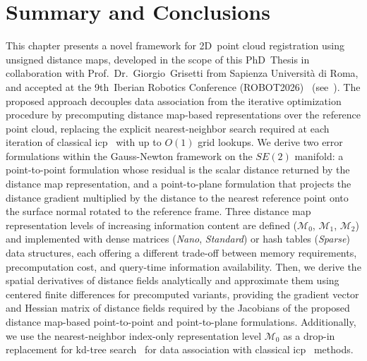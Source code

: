 \section{Summary and Conclusions}\label{sec:distance-maps:conclusions}

This chapter presents a novel framework for 2D~point cloud registration using
unsigned distance maps, developed in the scope of this PhD~Thesis in
collaboration with Prof.~Dr.~Giorgio~Grisetti from Sapienza Università di Roma,
and accepted at the 9th~Iberian Robotics Conference
(ROBOT2026)~\cite{sousa:robot:2026} (see~).
The proposed approach decouples data association from the iterative optimization
procedure by precomputing distance map-based
representations over the reference point cloud,
replacing the explicit nearest-neighbor search required at each iteration of
classical \gls{icp}~\cite{besl-mckay:tpami:1992,chen-medioni:icra:1991}
with up to $O(1)$ grid lookups. We derive two error formulations within
the Gauss-Newton framework on the $SE(2)$ manifold:
a point-to-point formulation whose residual is the scalar distance
returned by the distance map representation, and a point-to-plane formulation
that projects the distance gradient multiplied by the distance to the nearest
reference point onto the surface normal rotated to the reference frame. Three
distance map representation levels of increasing information content are defined
($\mathcal{M}_0$, $\mathcal{M}_1$, $\mathcal{M}_2$) and implemented with dense
matrices (\emph{Nano}, \emph{Standard}) or hash tables (\emph{Sparse}) data
structures, each offering a different trade-off between memory requirements,
precomputation cost, and query-time information availability.
Then, we derive the spatial derivatives of distance fields analytically and
approximate them using centered finite differences for precomputed variants,
providing the gradient vector and Hessian matrix of distance fields required by
the Jacobians of the proposed distance map-based
point-to-point and point-to-plane formulations.
Additionally, we use the nearest-neighbor index-only representation level
$\mathcal{M}_0$ as a drop-in replacement for kd-tree
search~\cite{bentley:cacm:1975} for data association with classical
\gls{icp}~\cite{besl-mckay:tpami:1992,chen-medioni:icra:1991} methods.

